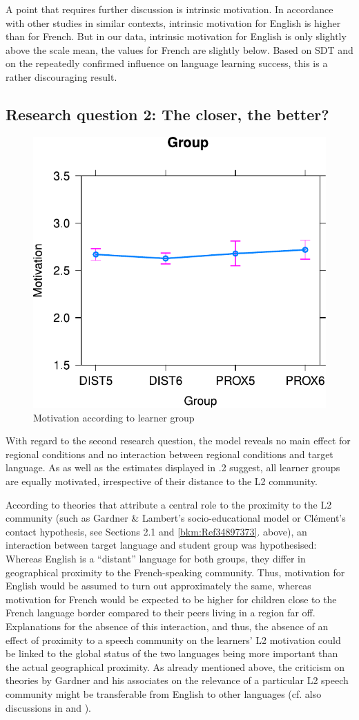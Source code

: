 \documentclass[output=paper]{langsci/langscibook}
\begin{document}
A point that requires further discussion is intrinsic motivation. In accordance with other studies in similar contexts, intrinsic motivation for English is higher than for French. But in our data, intrinsic motivation for English is only slightly above the scale mean, the values for French are slightly below. Based on  SDT and on the repeatedly confirmed influence on language learning success, this is a rather discouraging result.

\subsection{Research question 2: The closer, the better?}

  
\begin{figure}
\includegraphics[width=.5\textwidth]{figures/Fig7.2.pdf}
\caption{Motivation according to learner group\label{fig:07:2}}
\end{figure}

With regard to the second research question, the model reveals no main effect for regional conditions and no interaction between regional conditions and target language. As  as well as the estimates displayed in .2 suggest, all learner groups are equally motivated, irrespective of their distance to the L2 community.

According to theories that attribute a central role to the proximity to the L2 community (such as Gardner \& Lambert's socio-educational model or Clément's contact hypothesis, see Sections 2.1 and \ref{bkm:Ref34897373}. above), an interaction between target language and student group was hypothesised: Whereas English is a ``distant'' language for both groups, they differ in geographical proximity to the French-speaking community. Thus, motivation for English would be assumed to turn out approximately the same, whereas motivation for French would be expected to be higher for children close to the French language border compared to their peers living in a region far off. \\
Explanations for the absence of this interaction, and thus, the absence of an effect of proximity to a speech community on the learners’ L2 motivation could be linked to the global status of the two languages being more important than the actual geographical proximity. As already mentioned above, the criticism on theories by Gardner and his associates on the relevance of a particular L2 speech community might be transferable from English to other languages (cf. also discussions in \citealt{Busse2017} and \citealt{Ushioda2017}).
\end{document}
